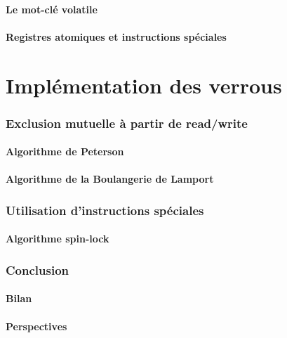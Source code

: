 \documentclass[9pt, handout]{beamer}
\begin{document}
\subsection{Le mot-clé volatile}


 
\subsection{Registres atomiques et instructions spéciales}



 
 
 
\part{Implémentation des verrous}
 
 
\section{Exclusion mutuelle à partir de read/write}
 
\subsection{Algorithme de Peterson}





 
\subsection{Algorithme de la Boulangerie de Lamport}


 
\section{Utilisation d'instructions spéciales}
 
\subsection{Algorithme spin-lock}
  
 
 
\section{Conclusion}
 
\subsection{Bilan}

 
\subsection{Perspectives}


\end{document}
